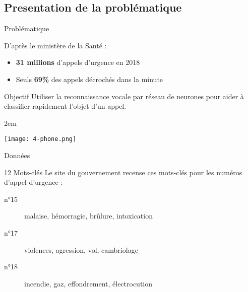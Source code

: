 \subsection{Presentation de la problématique}
\begin{frame}{Problématique}
    \begin{alertblock}{D'après le ministère de la Santé : }
        \begin{itemize}
            \item \textbf{31 millions} d'appels d'urgence en 2018
            \item Seuls \textbf{69\%} des appels décrochés dans la minute
        \end{itemize}
    \end{alertblock}
    \begin{block}{Objectif}
        Utiliser la reconnaissance vocale par réseau de neurones pour aider à classifier rapidement l'objet d'un appel.
    \end{block}
    \openup 2em
    \begin{center}
        \centering
        \texttt{[image: 4-phone.png]}
    \end{center}


\end{frame}


\begin{frame}{Données}

	\begin{block}{12 Mots-clés}
		Le site du gouvernement recense ces mots-clés pour les numéros d'appel d'urgence : \\
		\begin{description}
			\item[n°15] malaise, hémorragie, brûlure, intoxication
			\item[n°17] violences, agression, vol, cambriolage
			\item[n°18] incendie, gaz, effondrement, électrocution
		\end{description}
	\end{block}

\end{frame}